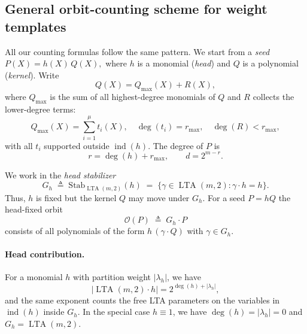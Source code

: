 \documentclass[conference]{IEEEtran}
\theoremstyle{definition}
\DeclareMathOperator{\LTA}{LTA}
\newcommand{\ind}{\operatorname{ind}}
\newcommand{\Stab}{\operatorname{Stab}}
\begin{document}


\subsection{General orbit-counting scheme for weight templates}
\label{subsec:general-counting}

All our counting formulas follow the same pattern.  We start from a \emph{seed}
\(
P(X) = h(X)\,Q(X),
\)
where $h$ is a monomial (\emph{head}) and $Q$ is a polynomial
(\emph{kernel}).  Write
\[
Q(X) = Q_{\max}(X) + R(X),
\]
where $Q_{\max}$ is the sum of all highest-degree monomials of $Q$ and
$R$ collects the lower-degree terms:
\[
Q_{\max}(X) = \sum_{i=1}^{\mu} t_i(X),\quad
\deg(t_i)=r_{\max},\quad
\deg(R)<r_{\max},
\]
with all $t_i$ supported outside $\ind(h)$.  The degree of $P$ is
\[
r = \deg(h)+r_{\max},\qquad d=2^{m-r}.
\]

We work in the \emph{head stabilizer}
\[
G_h \;\triangleq\; \mathrm{Stab}_{\LTA(m,2)}(h)
  \;=\; \{\gamma\in\LTA(m,2) : \gamma\cdot h = h\}.
\]
Thus, $h$ is fixed but the kernel $Q$ may move under $G_h$.  For a seed
$P=hQ$ the head-fixed orbit
\[
\mathcal{O}(P) \;\triangleq\; G_h\cdot P
\]
consists of all polynomials of the form $h\,(\gamma\cdot Q)$ with
$\gamma\in G_h$. 

\paragraph{Head contribution.}
For a monomial $h$ with partition weight $|\lambda_h|$, we have
\[
|\LTA(m,2)\cdot h| = 2^{\deg(h)+|\lambda_h|},
\]
and the same exponent counts the free LTA parameters on the variables
in $\ind(h)$ inside $G_h$.
In the special case $h\equiv1$, we have $\deg(h)=|\lambda_h|=0$ and
$G_h=\LTA(m,2)$.
\end{document}
